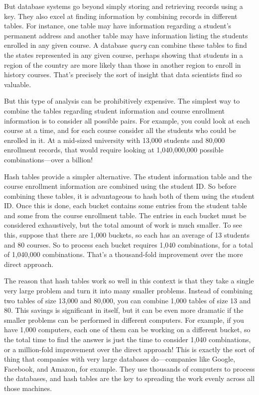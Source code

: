 But database systems go beyond simply storing and retrieving records
using a key. They also excel at finding information by combining
records in different tables. For instance, one table may have 
information regarding a student's permanent address and another table
may have information listing the students enrolled in any given course.
A database \emph{query} can combine these tables to find the states
represented in any given course, perhaps showing that students in a
region of the country are more likely than those in another region to
enroll in history courses. That's precisely the sort of insight that
data scientists find so valuable.

But this type of analysis can be prohibitively expensive. The simplest
way to combine the tables regarding student information and course
enrollment information is to consider all possible pairs. For example,
you could look at each course at a time, and for each course consider 
all the students who could be enrolled in it. At a mid-sized university
with 13,000 students and 80,000 enrollment records, that would require 
looking at 1,040,000,000 possible combinations---over a billion!

Hash tables provide a simpler alternative. The student information table
and the course enrollment information are combined using the student ID.
So before combining these tables, it is advantageous to hash both of them
using the student ID. Once this is done, each bucket contains some entries
from the student table and some from the course enrollment table. The entries
in each bucket must be considered exhaustively, but the total amount of
work is much smaller. To see this, suppose that there are 1,000 buckets, so
each has an average of 13 students and 80 courses. So to process each bucket 
requires 1,040 combinations, for a total of 1,040,000 combinations. That's
a thousand-fold improvement over the more direct approach.

The reason that hash tables work so well in this context is that they take
a single very large problem and turn it into many smaller problems. Instead
of combining two tables of size 13,000 and 80,000, you can combine 1,000
tables of size 13 and 80. This savings is significant in itself, but it can
be even more dramatic if the smaller problems can be performed in different
computers. For example, if you have 1,000 computers, each one of them can be
working on a different bucket, so the total time to find the answer is 
just the time to consider 1,040 combinations, or a million-fold improvement
over the direct approach! This is exactly the sort of thing that companies
with very large databases do---companies like Google, Facebook, and Amazon,
for example. They use thousands of computers to process the databases, and
hash tables are the key to spreading the work evenly across all those
machines.


